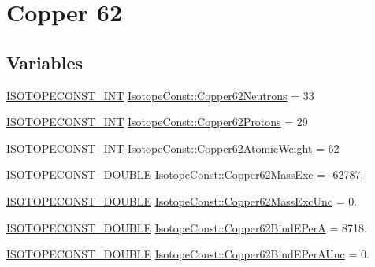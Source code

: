 \hypertarget{group___isotope_const-_copper-_cu62}{}\section{Copper 62}
\label{group___isotope_const-_copper-_cu62}
\subsection*{Variables}
\begin{DoxyCompactItemize}
\item 
\mbox{\hyperlink{group___isotope_const-_macros_ga5f18360b3e99483a35c32d789e62621c}{I\+S\+O\+T\+O\+P\+E\+C\+O\+N\+S\+T\+\_\+\+I\+NT}} \mbox{\hyperlink{group___isotope_const-_copper-_cu62_gac92b23aec9b50d2aa904d5bc44878802}{Isotope\+Const\+::\+Copper62\+Neutrons}} = 33
\item 
\mbox{\hyperlink{group___isotope_const-_macros_ga5f18360b3e99483a35c32d789e62621c}{I\+S\+O\+T\+O\+P\+E\+C\+O\+N\+S\+T\+\_\+\+I\+NT}} \mbox{\hyperlink{group___isotope_const-_copper-_cu62_gabe292d08e646b37982084e8f098653de}{Isotope\+Const\+::\+Copper62\+Protons}} = 29
\item 
\mbox{\hyperlink{group___isotope_const-_macros_ga5f18360b3e99483a35c32d789e62621c}{I\+S\+O\+T\+O\+P\+E\+C\+O\+N\+S\+T\+\_\+\+I\+NT}} \mbox{\hyperlink{group___isotope_const-_copper-_cu62_ga5b3018c28263450692e95b01da4769bf}{Isotope\+Const\+::\+Copper62\+Atomic\+Weight}} = 62
\item 
\mbox{\hyperlink{group___isotope_const-_macros_ga8f45a7272ce02c0b4c65c44636ed719a}{I\+S\+O\+T\+O\+P\+E\+C\+O\+N\+S\+T\+\_\+\+D\+O\+U\+B\+LE}} \mbox{\hyperlink{group___isotope_const-_copper-_cu62_gae508e7a4399cb0e41e9f69ec5ef3fe27}{Isotope\+Const\+::\+Copper62\+Mass\+Exc}} = -\/62787.
\item 
\mbox{\hyperlink{group___isotope_const-_macros_ga8f45a7272ce02c0b4c65c44636ed719a}{I\+S\+O\+T\+O\+P\+E\+C\+O\+N\+S\+T\+\_\+\+D\+O\+U\+B\+LE}} \mbox{\hyperlink{group___isotope_const-_copper-_cu62_ga7a3ccc57545f230955bf64e5473d781a}{Isotope\+Const\+::\+Copper62\+Mass\+Exc\+Unc}} = 0.
\item 
\mbox{\hyperlink{group___isotope_const-_macros_ga8f45a7272ce02c0b4c65c44636ed719a}{I\+S\+O\+T\+O\+P\+E\+C\+O\+N\+S\+T\+\_\+\+D\+O\+U\+B\+LE}} \mbox{\hyperlink{group___isotope_const-_copper-_cu62_gadb394b878f932f1b5bc448d4c728f4de}{Isotope\+Const\+::\+Copper62\+Bind\+E\+PerA}} = 8718.
\item 
\mbox{\hyperlink{group___isotope_const-_macros_ga8f45a7272ce02c0b4c65c44636ed719a}{I\+S\+O\+T\+O\+P\+E\+C\+O\+N\+S\+T\+\_\+\+D\+O\+U\+B\+LE}} \mbox{\hyperlink{group___isotope_const-_copper-_cu62_ga0c4ae240089cd1be980db5909e0ca12f}{Isotope\+Const\+::\+Copper62\+Bind\+E\+Per\+A\+Unc}} = 0.

\end{DoxyCompactItemize}
